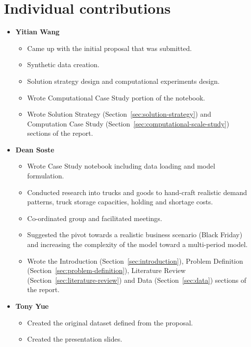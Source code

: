 \documentclass[a4paper,12pt]{article}
\begin{document}
\section{Individual contributions}\label{sec:individual-contributions}
\begin{itemize}
    \item \textbf{Yitian Wang}
    \begin{itemize}
        \item Came up with the initial proposal that was submitted.
        \item Synthetic data creation.
        \item Solution strategy design and computational experiments design.
        \item Wrote Computational Case Study portion of the notebook.
        \item Wrote Solution Strategy (Section~\ref{sec:solution-strategy}) and Computation Case Study (Section~\ref{sec:computational-scale-study}) sections of the report.
    \end{itemize}

    \item \textbf{Dean Soste}
    \begin{itemize}
        \item Wrote Case Study notebook including data loading and model formulation.
        \item Conducted research into trucks and goods to hand-craft realistic demand patterns, truck storage capacities, holding and shortage costs.
        \item Co-ordinated group and facilitated meetings.
        \item Suggested the pivot towards a realistic business scenario (Black Friday) and increasing the complexity of the model toward a multi-period model.
        \item Wrote the Introduction (Section~\ref{sec:introduction}), Problem Definition (Section~\ref{sec:problem-definition}), Literature Review (Section~\ref{sec:literature-review}) and Data (Section~\ref{sec:data}) sections of the report.
    \end{itemize}

    \item \textbf{Tony Yue}
    \begin{itemize}
        \item Created the original dataset defined from the proposal.
        \item Created the presentation slides.
    \end{itemize}


\end{itemize}
\end{document}
